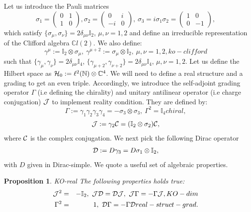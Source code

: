 \documentclass[10pt]{book}
\theoremstyle{break}
\newtheorem{proposition}{Proposition}
\begin{document}
Let us introduce the Pauli matrices
\begin{equation*}
\sigma_1=\begin{pmatrix}
0&1\\ 
1&0
\end{pmatrix}, \sigma_2=\begin{pmatrix}
0&i\\ 
-i&0
\end{pmatrix},\ \sigma_3=i\sigma_1\sigma_2=\begin{pmatrix}
1&0\\
0&-1\end{pmatrix},
\end{equation*}
which satisfy $\{\sigma_\mu,\sigma_\nu\}=2\delta_{\mu\nu}\mathbb{I}_2$, $\mu,\nu=1,2$ and define an irreducible representation of the Clifford algebra $\mathbb{C}l(2)$. We also define:
\begin{equation*}
\gamma^\mu:=\mathbb{I}_2\otimes\sigma_\mu,\ \gamma^{\mu+2}:=\sigma_\mu\otimes\mathbb{I}_2,\ \mu,\nu=1,2,{ko-clifford}
\end{equation*}
such that $\{\gamma_\mu,\gamma_\nu \}=2\delta_{\mu\nu}\mathbb{I}_4$, $\{\gamma_{\mu+2},\gamma_{\nu+2} \}=2\delta_{\mu\nu}\mathbb{I}_4$, $\mu,\nu=1,2$. Let us define the Hilbert space as ${\cal{H}}_0:=\ell^2(\mathbb{N})\otimes\mathbb{C}^4$. We will need to define a real structure and a grading to get an even triple. Accordingly, we introduce the self-adjoint grading operator $\Gamma$ (i.e defining the chirality) and unitary antilinear operator (i.e charge conjugation) ${\cal{J}}$ to implement reality condition. They are defined by:
\begin{equation*}
\Gamma:=\gamma_1\gamma_2\gamma_3\gamma_4=-\sigma_3\otimes\sigma_3,\ \Gamma^2=\mathbb{I}_4{chiral},
\end{equation*}
\begin{equation*}
{\cal{J}}:=\gamma_2{\cal{C}}=(\mathbb{I}_2\otimes\sigma_2){\cal{C}},
\end{equation*}
where ${\cal{C}}$ is the complex conjugation. We next pick the following Dirac operator
\begin{equation*}
{\cal{D}}:=D\gamma_3=D\sigma_1\otimes\mathbb{I}_2,
\end{equation*}
with $D$ given in {Dirac-simple}. We quote a useful set of algebraic properties.
\begin{proposition}{KO-real}
The following properties holds true:
\begin{eqnarray*}
{\cal{J}}^2&=&-\mathbb{I}_2,\ {\cal{J}}{\cal{D}}={\cal{D}}{\cal{J}},\ {\cal{J}}\Gamma=-\Gamma{\cal{J}},{KO-dim}\\ 
\Gamma^2&=&1,\ {\cal{D}}\Gamma=-\Gamma{\cal{D}}{real-struct-grad}.
\end{eqnarray*}
\end{proposition}
\end{document}
